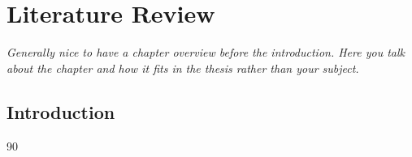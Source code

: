 
\chapter{Literature Review} \label{Ch:LitRev}

\textit{Generally nice to have a chapter overview before the introduction. Here you talk about the chapter and how it fits in the thesis rather than your subject.}

\section{Introduction}
 90\textdegree 
 

